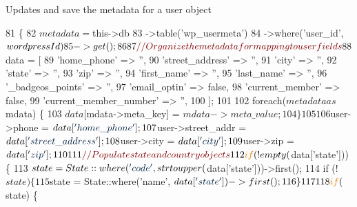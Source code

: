 Updates and save the metadata for a user object 
\begin{DoxyCode}
81     \{
82         $metadata = $this->db
83             ->table(\textcolor{stringliteral}{'wp\_usermeta'})
84             ->where(\textcolor{stringliteral}{'user\_id'}, $wordpressId)
85             ->get();
86 
87         \textcolor{comment}{// Organize the metadata for mapping to user fields}
88         $data = [
89             \textcolor{stringliteral}{'home\_phone'}            => \textcolor{stringliteral}{''},
90             \textcolor{stringliteral}{'street\_address'}        => \textcolor{stringliteral}{''},
91             \textcolor{stringliteral}{'city'}                  => \textcolor{stringliteral}{''},
92             \textcolor{stringliteral}{'state'}                 => \textcolor{stringliteral}{''},
93             \textcolor{stringliteral}{'zip'}                   => \textcolor{stringliteral}{''},
94             \textcolor{stringliteral}{'first\_name'}            => \textcolor{stringliteral}{''},
95             \textcolor{stringliteral}{'last\_name'}             => \textcolor{stringliteral}{''},
96             \textcolor{stringliteral}{'\_badgeos\_points'}       => \textcolor{stringliteral}{''},
97             \textcolor{stringliteral}{'email\_optin'}           => \textcolor{keyword}{false},
98             \textcolor{stringliteral}{'current\_member'}        => \textcolor{keyword}{false},
99             \textcolor{stringliteral}{'current\_member\_number'} => \textcolor{stringliteral}{''},
100         ];
101 
102         \textcolor{keywordflow}{foreach}($metadata as $mdata) \{
103             $data[$mdata->meta\_key] = $mdata->meta\_value;
104         \}
105 
106         $user->phone            = $data[\textcolor{stringliteral}{'home\_phone'}];
107         $user->street\_addr      = $data[\textcolor{stringliteral}{'street\_address'}];
108         $user->city             = $data[\textcolor{stringliteral}{'city'}];
109         $user->zip              = $data[\textcolor{stringliteral}{'zip'}];
110 
111         \textcolor{comment}{// Populate state and country objects}
112         \textcolor{keywordflow}{if} (!empty($data[\textcolor{stringliteral}{'state'}])) \{
113             $state = State::where(\textcolor{stringliteral}{'code'}, strtoupper($data[\textcolor{stringliteral}{'state'}]))->first();
114             \textcolor{keywordflow}{if} (!$state) \{
115                 $state = State::where(\textcolor{stringliteral}{'name'}, $data[\textcolor{stringliteral}{'state'}])->first();
116             \}
117 
118             \textcolor{keywordflow}{if} ($state) \{

\end{DoxyCode}
